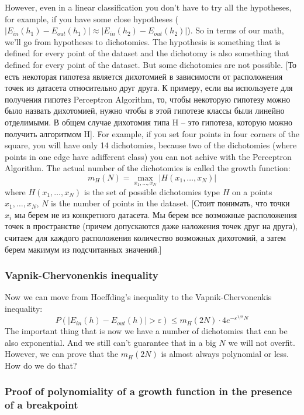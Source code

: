 However, even in a linear classification you don't have to try all the hypotheses, for example, if you have some close hypotheses ($|E_{in}(h_1)-E_{out}(h_1)|\approx|E_{in}(h_2)-E_{out}(h_2)|$). So in terms of our math, we'll go from hypotheses to dichotomies. The hypothesis is something that is defined for every point of the dataset and the dichotomy is also something that defined for every point of the dataset. But some dichotomies are not possible. [То есть некоторая гипотеза является дихотомией в зависимости от расположения точек из датасета относительно друг друга. К примеру, если вы используете для получения гипотез Perceptron Algorithm, то, чтобы некоторую гипотезу можно было назвать дихотомией, нужно чтобы в этой гипотезе классы были линейно отделимыми. В общем случае дихотомия типа H -- это гипотеза, которую можно получить алгоритмом H]. For example, if you set four points in four corners of the square, you will have only 14 dichotomies, because two of the dichotomies (where points in one edge have adifferent class) you can not achive with the Perceptron Algorithm. The actual number of the dichotomies is called the growth function:
$$m_H(N)=\max\limits_{x_1,\ldots,x_N}|H(x_1,\ldots,x_N)|$$
where $H(x_1,\ldots,x_N)$ is the set of possible dichotomies type $H$ on a points $x_1,\ldots,x_N$, $N$ is the number of points in the dataset. [Стоит понимать, что точки $x_i$ мы берем не из конкретного датасета. Мы берем все возможные расположения точек в пространстве (причем допускаются даже наложения точек друг на друга), считаем для каждого расположения количество возможных дихотомий, а затем берем макимум из подсчитанных значений.]

\subsubsection*{Vapnik-Chervonenkis inequality}

Now we can move from Hoeffding's inequality to the Vapnik-Chervonenkis inequality:
$$P(|E_{in}(h)-E_{out}(h)|>\varepsilon)\le m_H(2N)\cdot4e^{-\varepsilon^{1/8}N}$$
The important thing that is now we have a number of dichotomies that can be also exponential. And we still can't guarantee that in a big $N$ we will not overfit. However, we can prove that the $m_H(2N)$ is almost always polynomial or less. How do we do that? 

\subsubsection*{Proof of polynomiality of a growth function in the presence of a breakpoint}

